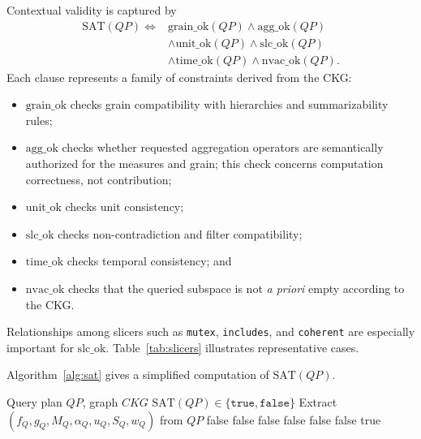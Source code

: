 \documentclass[journal]{IEEEtran}
\begin{document}
Contextual validity is captured by
\begin{equation}
\label{eq:sat}
\begin{aligned}
\mathrm{SAT}(QP) \Leftrightarrow {} & \mathrm{grain\_ok}(QP)\wedge \mathrm{agg\_ok}(QP) \\
& \wedge \mathrm{unit\_ok}(QP)\wedge \mathrm{slc\_ok}(QP) \\
& \wedge \mathrm{time\_ok}(QP)\wedge \mathrm{nvac\_ok}(QP).
\end{aligned}
\end{equation}
Each clause represents a family of constraints derived from the CKG:
\begin{itemize}
  \item $\mathrm{grain\_ok}$ checks grain compatibility with hierarchies and summarizability rules;
  \item $\mathrm{agg\_ok}$ checks whether requested aggregation operators are semantically authorized for the measures and grain; this check concerns computation correctness, not contribution;
  \item $\mathrm{unit\_ok}$ checks unit consistency;
  \item $\mathrm{slc\_ok}$ checks non-contradiction and filter compatibility;
  \item $\mathrm{time\_ok}$ checks temporal consistency; and
  \item $\mathrm{nvac\_ok}$ checks that the queried subspace is not \emph{a priori} empty according to the CKG.
\end{itemize}

Relationships among slicers such as \texttt{mutex}, \texttt{includes}, and \texttt{coherent} are especially important for $\mathrm{slc\_ok}$. Table~\ref{tab:slicers} illustrates representative cases.


Algorithm~\ref{alg:sat} gives a simplified computation of $\mathrm{SAT}(QP)$.
\begin{algorithm}[!t]
\caption{Contextual-validity check $\mathrm{SAT}(QP)$}
\label{alg:sat}
\begin{algorithmic}[1]
\REQUIRE Query plan $QP$, graph $CKG$
\ENSURE $\mathrm{SAT}(QP)\in\{\texttt{true},\texttt{false}\}$
\STATE Extract $(f_Q,g_Q,M_Q,\alpha_Q,u_Q,S_Q,w_Q)$ from $QP$
 \RETURN false \ENDIF
{} \RETURN false \ENDIF
{} \RETURN false \ENDIF
{} \RETURN false \ENDIF
{} \RETURN false \ENDIF
{} \RETURN false \ENDIF
\RETURN true
\end{algorithmic}
\end{algorithm}
\end{document}
